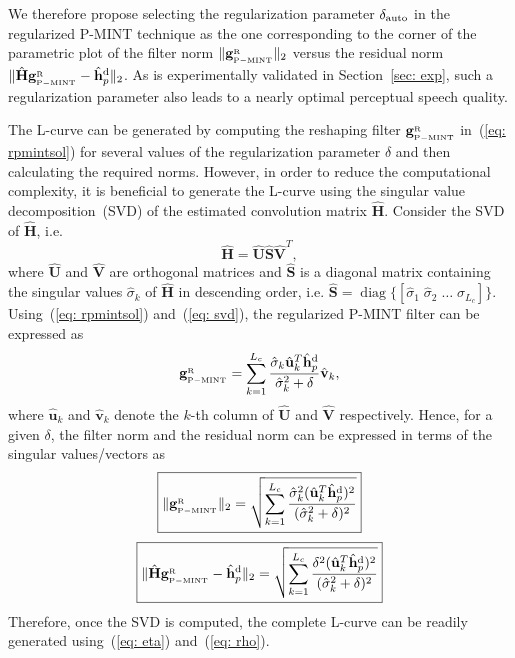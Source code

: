 \documentclass[10pt]{IEEEtran}
\DeclareMathOperator{\diag}{diag}
\begin{document}
We therefore propose selecting the regularization parameter $\delta_{\rm auto}$ in the regularized P-MINT technique as the one corresponding to the corner of the parametric plot of the filter norm $\|\mathbf{g}_{{}_{\rm P-MINT}}^{_{\rm R}}\|_2$ versus the residual norm $\|\hat{\mathbf{H}}\mathbf{g}_{{}_{\rm P-MINT}}^{_{\rm R}} - \hat{\mathbf{h}}_p^{\rm d}\|_2$.
As is experimentally validated in Section~\ref{sec: exp}, such a regularization parameter also leads to a nearly optimal perceptual speech quality.

The L-curve can be generated by computing the reshaping filter $\mathbf{g}_{{}_{\rm P-MINT}}^{_{\rm R}}$ in~(\ref{eq: rpmintsol}) for several values of the regularization parameter $\delta$ and then calculating the required norms.
However, in order to reduce the computational complexity, it is beneficial to generate the L-curve using the singular value decomposition~(SVD) of the estimated convolution matrix $\hat{\mathbf{H}}$.
Consider the SVD of $\hat{\mathbf{H}}$, i.e.
\begin{equation}\label{eq: svd}
  \hat{\mathbf{H}} = \hat{\mathbf{U}}\hat{\mathbf{S}}\hat{\mathbf{V}}^T,
\end{equation}
where $\hat{\mathbf{U}}$ and $\hat{\mathbf{V}}$ are orthogonal matrices and $\hat{\mathbf{S}}$ is a diagonal matrix containing the singular values $\hat{\sigma}_k$ of $\hat{\mathbf{H}}$ in descending order, i.e. $\hat{\mathbf{S}} = {\diag}\{\left[\hat{\sigma}_1 \; \hat{\sigma}_2 \; \ldots \; \hat{\sigma}_{L_c}\right]\}$.
Using~(\ref{eq: rpmintsol}) and~(\ref{eq: svd}), the regularized P-MINT filter can be expressed as
\begin{equation}
\mathbf{g}_{{}_{\rm P-MINT}}^{_{\rm R}}  =  \sum_{k=1}^{L_c} \frac{\hat{\sigma}_k \hat{\mathbf{u}}_k^T \hat{\mathbf{h}}_p^{\rm d} }{\hat{\sigma}_k^2+\delta}  \hat{\mathbf{v}}_k,
\end{equation}
where $\hat{\mathbf{u}}_k$ and $\hat{\mathbf{v}}_k$ denote the $k$-th column of $\hat{\mathbf{U}}$ and $\hat{\mathbf{V}}$ respectively.
Hence, for a given $\delta$, the filter norm and the residual norm can be expressed in terms of the singular values/vectors as
\begin{equation}
\label{eq: eta}
\boxed{\|\mathbf{g}_{{}_{\rm P-MINT}}^{_{\rm R}}\|_2 = \sqrt{\sum_{k = 1}^{L_c} \frac{\hat{\sigma}_k^2 (\hat{\mathbf{u}}_k^T \hat{\mathbf{h}}_p^{\rm d})^2}{(\hat{\sigma}_k^2 + \delta)^2}}}
\end{equation}
\begin{equation}
\label{eq: rho}
\boxed{ \|\hat{\mathbf{H}}\mathbf{g}_{{}_{\rm P-MINT}}^{_{\rm R}} - \hat{\mathbf{h}}_p^{\rm d}\|_2 = \sqrt{\sum_{k = 1}^{L_c} \frac{\delta^2 (\hat{\mathbf{u}}_k^T \hat{\mathbf{h}}_p^{\rm d})^2}{(\hat{\sigma}_k^2 + \delta)^2}}}
\end{equation}
Therefore, once the SVD is computed, the complete L-curve can be readily generated using~(\ref{eq: eta}) and~(\ref{eq: rho}).
\end{document}
